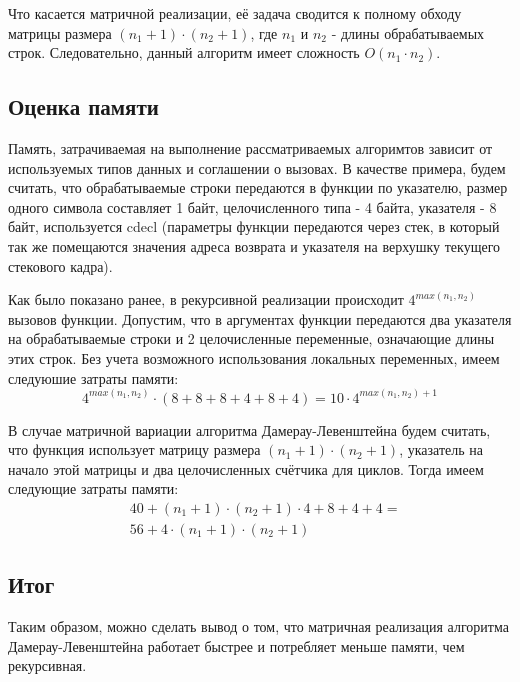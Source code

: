 Что касается матричной реализации, её задача сводится к полному обходу матрицы размера \((n_1+1)\cdot{}(n_2+1)\), где \(n_1\) и \(n_2\) - длины обрабатываемых строк. Следовательно, данный алгоритм имеет сложность \(O(n_1\cdot{}n_2)\).

\subsection{Оценка памяти}
Память, затрачиваемая на выполнение рассматриваемых алгоримтов зависит от используемых типов данных и соглашении о вызовах. В качестве примера, будем считать, что обрабатываемые строки передаются в функции по указателю, размер одного символа составляет 1 байт, целочисленного типа - 4 байта, указателя - 8 байт, используется cdecl (параметры функции передаются через стек, в который так же помещаются значения адреса возврата и указателя на верхушку текущего стекового кадра).

Как было показано ранее, в рекурсивной реализации происходит \(4^{max(n_1, n_2)}\) вызовов функции. Допустим, что в аргументах функции передаются два указателя на обрабатываемые строки и 2 целочисленные переменные, означающие длины этих строк. Без учета возможного использования локальных переменных, имеем следуюшие затраты памяти:
\begin{equation}
    4^{max(n_1, n_2)} \cdot{} (8+8 + 8+4 + 8+4) = 10 \cdot 4^{max(n_1, n_2) + 1}
\end{equation}

В случае матричной вариации алгоритма Дамерау-Левенштейна будем считать, что функция использует матрицу размера \((n_1+1)\cdot{}(n_2+1)\), указатель на начало этой матрицы и два целочисленных счётчика для циклов. Тогда имеем следующие затраты памяти:
\begin{equation}
    \begin{split}
    & 40 + (n_1+1)\cdot{}(n_2+1)\cdot{}4 + 8 + 4 + 4 = \\
    & 56 + 4\cdot{}(n_1+1)\cdot{}(n_2+1)
    \end{split}
\end{equation}

\subsection{Итог}
Таким образом, можно сделать вывод о том, что матричная реализация алгоритма Дамерау-Левенштейна работает быстрее и потребляет меньше памяти, чем рекурсивная.


